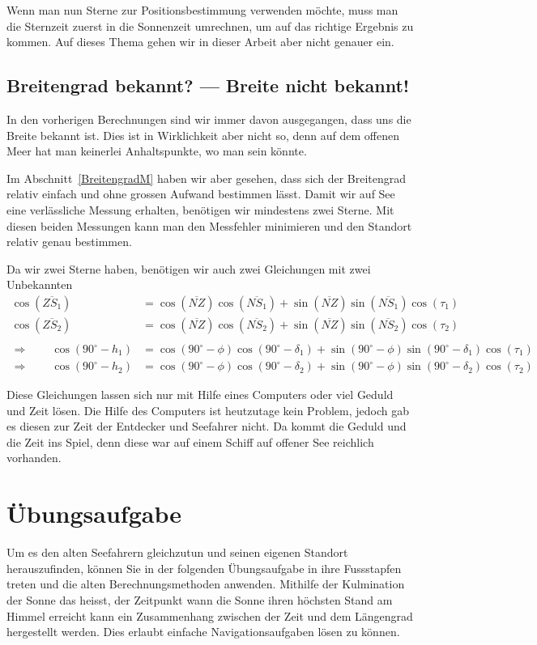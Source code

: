 \begin{refsection}
Wenn man nun Sterne zur Positionsbestimmung verwenden möchte, muss man die Sternzeit zuerst in die Sonnenzeit umrechnen, um auf das richtige Ergebnis zu kommen. Auf dieses Thema gehen wir in dieser Arbeit aber nicht genauer ein.


\subsection{Breitengrad bekannt? --- Breite nicht bekannt!}

In den vorherigen Berechnungen sind wir immer davon ausgegangen, dass uns die Breite bekannt ist. Dies ist in Wirklichkeit aber nicht so, denn auf dem offenen Meer hat man keinerlei Anhaltspunkte, wo man sein könnte.

Im Abschnitt~\ref{BreitengradM}  haben wir aber gesehen, dass sich der Breitengrad relativ einfach und ohne grossen Aufwand bestimmen lässt. Damit wir auf See eine verlässliche Messung erhalten, benötigen wir mindestens zwei Sterne. Mit diesen beiden Messungen kann man den Messfehler minimieren und den Standort relativ genau bestimmen.

Da wir zwei Sterne haben, benötigen wir auch zwei Gleichungen mit zwei Unbekannten
\begin{align*}
\cos(\overline{ZS_1}) &= \cos(\overline{NZ}) \cos(\overline{NS_1}) + \sin(\overline{NZ}) \sin(\overline{NS_1}) \cos(\tau_1) \\
\cos(\overline{ZS_2}) &= \cos(\overline{NZ}) \cos(\overline{NS_2}) + \sin(\overline{NZ}) \sin(\overline{NS_2}) \cos(\tau_2) \\
\\
\Rightarrow \quad \quad
\cos(90^{\circ} - h_1) &= \cos(90^{\circ} - \phi) \cos(90^{\circ} - \delta_1) + \sin(90^{\circ} - \phi)\sin(90^{\circ} - \delta_1) \cos(\tau_1) \\
\Rightarrow \quad \quad
\cos(90^{\circ} - h_2) &= \cos(90^{\circ} - \phi) \cos(90^{\circ} - \delta_2) + \sin(90^{\circ} - \phi)\sin(90^{\circ} - \delta_2) \cos(\tau_2)
\end{align*}

Diese Gleichungen lassen sich nur mit Hilfe eines Computers oder viel Geduld und Zeit lösen. Die Hilfe des Computers ist heutzutage kein Problem, jedoch gab es diesen zur Zeit der Entdecker und Seefahrer nicht. Da kommt die Geduld und die Zeit ins Spiel, denn diese war auf einem Schiff auf offener See reichlich vorhanden.


\section{Übungsaufgabe}
Um es den alten Seefahrern gleichzutun und seinen eigenen Standort herauszufinden, können Sie in der folgenden Übungsaufgabe in ihre Fussstapfen treten und die alten Berechnungsmethoden anwenden.
Mithilfe der Kulmination der Sonne das heisst, der Zeitpunkt wann die Sonne ihren höchsten Stand am Himmel erreicht kann ein Zusammenhang zwischen der Zeit und dem Längengrad hergestellt werden. Dies erlaubt einfache Navigationsaufgaben lösen zu können.
\bigskip


\end{refsection}
